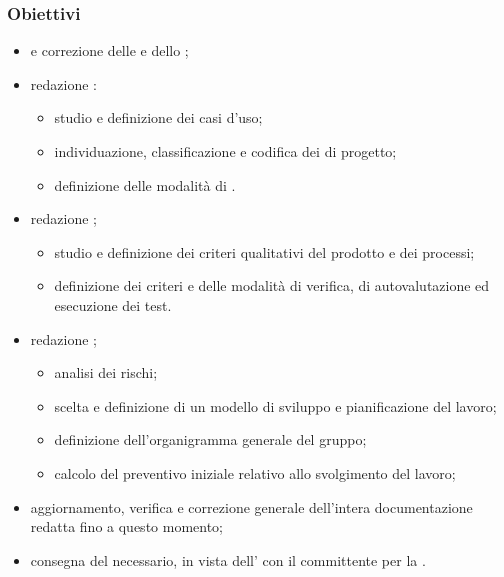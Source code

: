         \subsubsection{Obiettivi}
            \begin{itemize}
                \item {} e correzione delle \NdP{} e dello \SdF{};
                \item redazione \AdR{}:
                \begin{itemize}
                    \item studio e definizione dei casi d'uso;
                    \item individuazione, classificazione e codifica dei  di progetto;
                    \item definizione delle modalità di .
                \end{itemize}
                \item redazione \PdQ{};
                \begin{itemize}
                    \item studio e definizione dei criteri qualitativi del prodotto e dei processi;
                    \item definizione dei criteri e delle modalità di verifica, di autovalutazione ed esecuzione dei test.
                \end{itemize}
                \item redazione \PdP{};
                \begin{itemize}
                    \item analisi dei rischi;
                    \item scelta e definizione di un modello di sviluppo e pianificazione del lavoro;
                    \item definizione dell'organigramma generale del gruppo;
                    \item calcolo del preventivo iniziale relativo allo svolgimento del lavoro;
                \end{itemize}
                \item aggiornamento, verifica e correzione generale dell'intera documentazione redatta fino a questo momento;
                \item consegna del  necessario, in vista dell' con il committente per la \RR{}.
            \end{itemize}